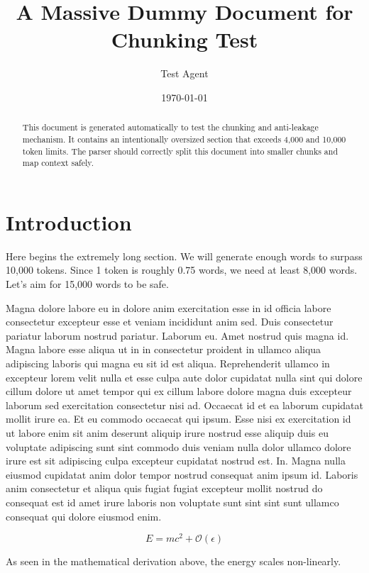 \documentclass{article}
\title{A Massive Dummy Document for Chunking Test}
\author{Test Agent}
\date{\today}
\begin{document}
\maketitle

\begin{abstract}
This document is generated automatically to test the chunking and anti-leakage mechanism. It contains an intentionally oversized section that exceeds 4,000 and 10,000 token limits. The parser should correctly split this document into smaller chunks and map context safely.
\end{abstract}

\section{Introduction}
Here begins the extremely long section. We will generate enough words to surpass 10,000 tokens. Since 1 token is roughly 0.75 words, we need at least 8,000 words. Let's aim for 15,000 words to be safe.

Magna dolore labore eu in dolore anim exercitation esse in id officia labore consectetur excepteur esse et veniam incididunt anim sed. Duis consectetur pariatur laborum nostrud pariatur. Laborum eu. Amet nostrud quis magna id. Magna labore esse aliqua ut in in consectetur proident in ullamco aliqua adipiscing laboris qui magna eu sit id est aliqua. Reprehenderit ullamco in excepteur lorem velit nulla et esse culpa aute dolor cupidatat nulla sint qui dolore cillum dolore ut amet tempor qui ex cillum labore dolore magna duis excepteur laborum sed exercitation consectetur nisi ad. Occaecat id et ea laborum cupidatat mollit irure ea. Et eu commodo occaecat qui ipsum. Esse nisi ex exercitation id ut labore enim sit anim deserunt aliquip irure nostrud esse aliquip duis eu voluptate adipiscing sunt sint commodo duis veniam nulla dolor ullamco dolore irure est sit adipiscing culpa excepteur cupidatat nostrud est. In. Magna nulla eiusmod cupidatat anim dolor tempor nostrud consequat anim ipsum id. Laboris anim consectetur et aliqua quis fugiat fugiat excepteur mollit nostrud do consequat est id amet irure laboris non voluptate sunt sint sint sunt ullamco consequat qui dolore eiusmod enim.

\begin{equation}
    E = mc^2 + \mathcal{O}(\epsilon)
\end{equation}

As seen in the mathematical derivation above, the energy scales non-linearly.
\end{document}
